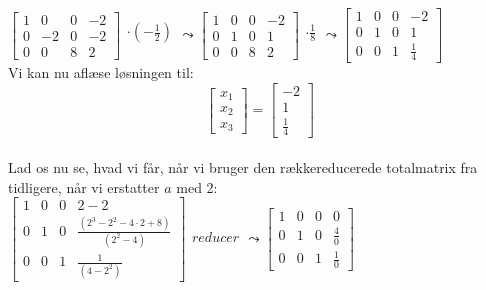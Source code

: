 \documentclass[a4paper,12pt]{article}
\begin{document}
$
\left[\begin{array}{ccc|c}
    1 & 0 & 0 & -2 \\
    0 & -2 & 0 & -2 \\
    0 & 0 & 8 & 2
\end{array}\right]
\begin{array}{ccc}
    \\
    \cdot(-\frac{1}{2})\\
    \\
\end{array}
\leadsto
\left[\begin{array}{ccc|c}
    1 & 0 & 0 & -2 \\
    0 & 1 & 0 & 1 \\
    0 & 0 & 8 & 2
\end{array}\right]
\begin{array}{ccc}
    \\
    \cdot\frac{1}{8}\\
    \\
\end{array}
\leadsto
\left[\begin{array}{ccc|c}
    1 & 0 & 0 & -2 \\
    0 & 1 & 0 & 1 \\
    0 & 0 & 1 & \frac{1}{4}
\end{array}\right]
$\\

Vi kan nu aflæse løsningen til:
\[
\left[\begin{array}{c}
    x_1\\
    x_2\\
    x_3
\end{array}\right]
=
\left[\begin{array}{c}
    -2\\
    1\\
    \frac{1}{4}
\end{array}\right]
\]\\

Lad os nu se, hvad vi får, når vi bruger den rækkereducerede totalmatrix fra tidligere, når vi erstatter $a$ med 2:\\

$
\left[\begin{array}{ccc|c}
    1 & 0 & 0 & 2-2 \\
    0 & 1 & 0 & \frac{(2^3 - 2^2 - 4\cdot 2 + 8)}{(2^2 - 4)} \\
    0 & 0 & 1 & \frac{1}{(4-2^2)}
\end{array}\right]
\begin{array}{ccc}
    \\
    reducer\\
    \\
\end{array}
\leadsto
\left[\begin{array}{ccc|c}
    1 & 0 & 0 & 0 \\
    0 & 1 & 0 & \frac{4}{0} \\
    0 & 0 & 1 & \frac{1}{0}
\end{array}\right]
$\\
\end{document}
